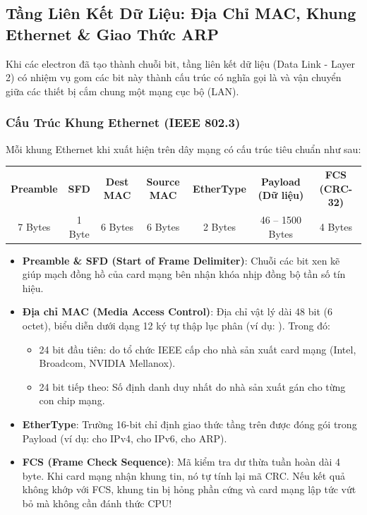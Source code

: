 \subsection{Tầng Liên Kết Dữ Liệu: Địa Chỉ MAC, Khung Ethernet \& Giao Thức ARP}
\label{subsec:datalink-mac-arp}
Khi các electron đã tạo thành chuỗi bit, tầng liên kết dữ liệu (Data Link - Layer 2) có nhiệm vụ gom các bit này thành cấu trúc có nghĩa gọi là  và vận chuyển giữa các thiết bị cắm chung một mạng cục bộ (LAN).

\subsubsection{Cấu Trúc Khung Ethernet (IEEE 802.3)}
Mỗi khung Ethernet khi xuất hiện trên dây mạng có cấu trúc tiêu chuẩn như sau:
\begin{center}
\small
\begin{tabular}{|c|c|c|c|c|c|c|}
\hline
\textbf{Preamble} & \textbf{SFD} & \textbf{Dest MAC} & \textbf{Source MAC} & \textbf{EtherType} & \textbf{Payload (Dữ liệu)} & \textbf{FCS (CRC-32)} \\
7 Bytes & 1 Byte & 6 Bytes & 6 Bytes & 2 Bytes & 46 -- 1500 Bytes & 4 Bytes \\
\hline
\end{tabular}
\end{center}
\begin{itemize}
  \item \textbf{Preamble \& SFD (Start of Frame Delimiter)}: Chuỗi các bit xen kẽ  giúp mạch đồng hồ của card mạng bên nhận khóa nhịp đồng bộ tần số tín hiệu.
  \item \textbf{Địa chỉ MAC (Media Access Control)}: Địa chỉ vật lý dài 48 bit (6 octet), biểu diễn dưới dạng 12 ký tự thập lục phân (ví dụ: ). Trong đó:
    \begin{itemize}
      \item 24 bit đầu tiên:  do tổ chức IEEE cấp cho nhà sản xuất card mạng (Intel, Broadcom, NVIDIA Mellanox).
      \item 24 bit tiếp theo: Số định danh duy nhất do nhà sản xuất gán cho từng con chip mạng.
    \end{itemize}
  \item \textbf{EtherType}: Trường 16-bit chỉ định giao thức tầng trên được đóng gói trong Payload (ví dụ:  cho IPv4,  cho IPv6,  cho ARP).
  \item \textbf{FCS (Frame Check Sequence)}: Mã kiểm tra dư thừa tuần hoàn  dài 4 byte. Khi card mạng nhận khung tin, nó tự tính lại mã CRC. Nếu kết quả không khớp với FCS, khung tin bị hỏng phần cứng và card mạng lập tức vứt bỏ mà không cần đánh thức CPU!
\end{itemize}

